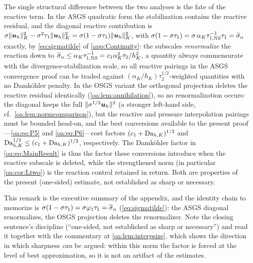 \begin{remark}
\label{oa:rem:mechanism}
The single structural difference between the two analyses is the fate of the reactive
term. In the ASGS quadratic form the stabilization contains the reactive residual, and
the diagonal reactive contribution is
$\sigma\lVert \boldsymbol{u}_h \rVert_K^2 - \sigma^2\tau_{1}\lVert \boldsymbol{u}_h \rVert_K^2
= \sigma(1-\sigma\tau_1)\lVert \boldsymbol{u}_h \rVert_K^2$, with
$\sigma(1-\sigma\tau_1) = \sigma\,\alpha_K\tau_{1,\mathrm{NS}}^{-1}\tau_1 =
\widetilde{\sigma}_\alpha$ exactly, by \cref{eq:sigmatilde} of \cref{app:Continuity}: the subscales \emph{renormalize} the reaction down to
$\widetilde{\sigma}_\alpha \le \alpha_K\tau_{1,\mathrm{NS}}^{-1} = c_1\alpha_K^2\tau_2/h_K^2$, a
quantity always commensurate with the divergence-stabilization scale, so all reactive
pairings in the ASGS convergence proof can be traded against
$(\alpha_K/h_K)\tau_2^{1/2}$-weighted quantities with no Damk\"ohler penalty. In the
OSGS variant the orthogonal projection deletes the reactive residual identically
(\cref{oa:lem:annihilation}), so no renormalization occurs: the diagonal keeps the full
$\lVert \sigma^{1/2}\boldsymbol{u}_h \rVert^2$ (a stronger left-hand side, cf.\
\cref{oa:lem:normcomparison}), but the reactive and pressure interpolation pairings must
be bounded head-on, and the best conversions available to the present proof---\cref{oa:eq:P5}
and \cref{oa:eq:P6}---cost factors $(c_1+\mathrm{Da}_{h,K})^{1/2}$ and $\mathrm{Da}_{h,K}^{1/2}\le(c_1+\mathrm{Da}_{h,K})^{1/2}$, respectively. The Damk\"ohler factor in
\cref{oa:eq:MainResult} is thus the factor these conversions introduce when the reactive
subscale is deleted, while the strengthened norm (in particular \cref{oa:cor:Ltwo}) is the
reaction control retained in return. Both are properties of the present (one-sided)
estimate, not established as sharp or necessary.
\end{remark}

\begin{pedagogy}
This remark is the executive summary of the appendix, and the identity chain to
memorize is $\sigma(1-\sigma\tau_1) = \sigma\varphi_1\tau_1 = \widetilde{\sigma}_{\alpha}$
(\cref{eq:sigmatilde}): the ASGS diagonal renormalizes, the OSGS projection
deletes the renormalizer. Note the closing sentence's discipline
(``one-sided, not established as sharp or necessary'') and read it together
with the commentary at \cref{oa:lem:interpsize}, which shows the direction in
which sharpness \emph{can} be argued: within this norm the factor is forced at
the level of best approximation, so it is not an artifact of the estimates.
\end{pedagogy}

